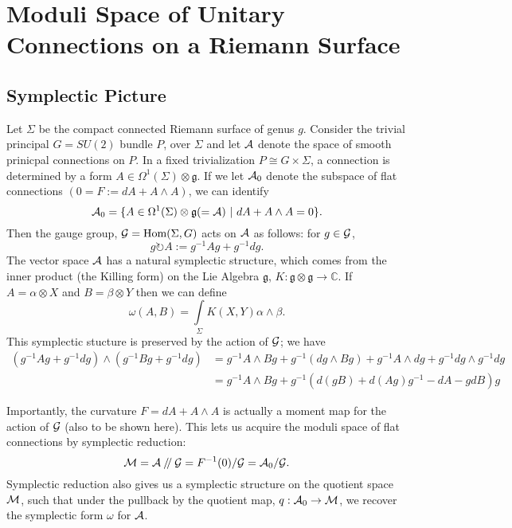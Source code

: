 \section{Moduli Space of Unitary Connections on a Riemann Surface}
\label{s:vectorbundles}
	\subsection{Symplectic Picture}
	 Let $\Sigma$ be the compact connected Riemann surface of genus $g$. Consider the trivial principal $G=SU(2)$ bundle $P$, over $\Sigma$ and let $\mathcal{A}$ denote the space of smooth prinicpal connections on $P$. In a fixed trivialization $P \cong G\times \Sigma$, a connection is determined by a form $A \in \Omega^1(\Sigma)\otimes \mathfrak{g}$. If we let $\mathcal{A}_0$ denote the subspace of flat connections $(0 = F:=dA + A\wedge A)$, we can identify
	\begin{equation}
	\mathcal{A}_0 = \{A \in \Omega^1(\Sigma)\otimes\mathfrak{g} (=\mathcal{A}) ~|~ dA + A\wedge A = 0\}.
	\end{equation}
	Then the gauge group, $\mathcal{G} = \text{Hom}(\Sigma, G)$ acts on $\mathcal{A}$ as follows: for $g\in \mathcal{G}$,
	\begin{equation}
	g\circlearrowright A := g^{-1}Ag + g^{-1}dg.
	\end{equation}
	The vector space $\mathcal{A}$ has a natural symplectic structure, which comes from the inner product (the Killing form) on the Lie Algebra $\mathfrak{g}$, $K:\mathfrak{g}\otimes\mathfrak{g}\to\mathbb{C}$. If $A = \alpha \otimes X$ and $B = \beta \otimes Y$ then we can define
	\begin{equation}
	\omega(A,B) = \int\limits_\Sigma K(X,Y)\alpha\wedge \beta.
	\end{equation}
	This symplectic stucture is preserved by the action of $\mathcal{G}$; we have
	\begin{align*}
	(g^{-1} A g + g^{-1}dg) \wedge (g^{-1} B g + g^{-1}dg) &= g^{-1}A\wedge B g + g^{-1}(dg\wedge Bg) + g^{-1}A\wedge dg + g^{-1}dg \wedge g^{-1}dg \\
	&= g^{-1} A\wedge B g + g^{-1}(d(gB) + d(Ag)g^{-1} - dA - gdB)g
	\end{align*}
	
	Importantly, the curvature $F = dA + A\wedge A$ is actually a moment map for the action of $\mathcal{G}$ (also to be shown here). This lets us acquire the moduli space of flat connections by symplectic reduction:
	\begin{equation}
	\mathcal{M} = \mathcal{A}\mathbin{/\mkern-4mu/}\mathcal{G} = F^{-1}(0)/ \mathcal{G}= \mathcal{A}_0/ \mathcal{G}.
	\end{equation} 
	Symplectic reduction also gives us a symplectic structure on the quotient space $\mathcal{M}$, such that under the pullback by the quotient map, $q:\mathcal{A}_0 \to \mathcal{M}$, we recover the symplectic form $\omega$ for $\mathcal{A}$.


